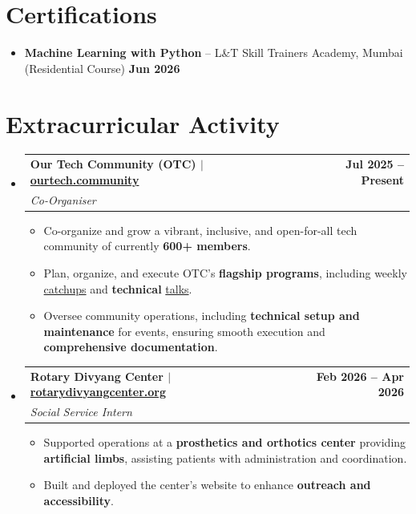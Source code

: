 \documentclass[letterpaper,11pt]{article}
\makeatletter
\newcommand{\resumeItem}[1]{
  \item\small{
    {#1 \vspace{-3pt}}
  }
}
\newcommand{\resumeSubheading}[4]{
  \vspace{-2pt}\item
    \begin{tabular*}{1.0\textwidth}[t]{l@{\extracolsep{\fill}}r}
      \vspace{-2pt}\textbf{#1} & \textbf{\small #2} \\
      \textit{\small#3} & \textit{\small #4} \\
    \end{tabular*}\vspace{-8pt}
} %
\newcommand{\resumeSubHeadingListStart}{\begin{itemize}[leftmargin=0.0in, label={}]}
\newcommand{\resumeSubHeadingListEnd}{\end{itemize}}
\newcommand{\resumeItemListStart}{\begin{itemize}}
\newcommand{\resumeItemListEnd}{\end{itemize}\vspace{-9pt}}
\makeatother
\begin{document}
\section{Certifications}
\resumeItemListStart
    \resumeItem{\textbf{Machine Learning with Python} -- L\&T Skill Trainers Academy, Mumbai (Residential Course) \hfill \textbf{Jun 2026}}
\resumeItemListEnd
\vspace{-7pt}

\section{Extracurricular Activity}
    \resumeSubHeadingListStart
        \resumeSubheading
            {\textbf{\normalsize{Our Tech Community (OTC)}} $|$ {\normalfont \href{https://ourtech.community}{ourtech.community}}}{Jul 2025 -- Present}
            {Co-Organiser}{}
            \resumeItemListStart
                \resumeItem{Co-organize and grow a vibrant, inclusive, and open-for-all tech community of currently \textbf{600+ members}.}
                \resumeItem{Plan, organize, and execute OTC's \textbf{flagship programs}, including weekly \href{https://catchup.ourtech.community/}{catchups} and \textbf{technical} \href{https://talks.ourtech.community/}{talks}.}
                \resumeItem{Oversee community operations, including \textbf{technical setup and maintenance} for events, ensuring smooth execution and \textbf{comprehensive documentation}.}
            \resumeItemListEnd
            \vspace{3pt}

    \resumeSubheading
        {\textbf{\normalsize{Rotary Divyang Center}} $|$ {\normalfont \href{https://rotarydivyangcenter.org}{rotarydivyangcenter.org}}}{Feb 2026 -- Apr 2026}
        {Social Service Intern}{}
        \resumeItemListStart
            \resumeItem{Supported operations at a \textbf{prosthetics and orthotics center} providing \textbf{artificial limbs}, assisting patients with administration and coordination.}
            \resumeItem{Built and deployed the center's website to enhance \textbf{outreach and accessibility}.}
        \resumeItemListEnd
    \resumeSubHeadingListEnd
\vspace{-12pt}
\end{document}
